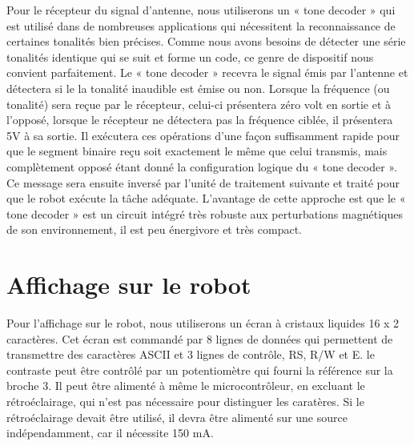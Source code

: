 Pour le récepteur du signal d’antenne, nous utiliserons un « tone decoder » qui est utilisé dans de nombreuses applications qui nécessitent la reconnaissance de certaines tonalités bien précises. Comme nous avons besoins de détecter une série tonalités identique qui se suit et forme un code, ce genre de dispositif nous convient parfaitement. Le « tone decoder » recevra le signal émis par l’antenne et détectera si le la tonalité inaudible est émise ou non. Lorsque la fréquence (ou tonalité) sera reçue par le récepteur, celui-ci présentera zéro volt en sortie et à l’opposé, lorsque le récepteur ne détectera pas la fréquence ciblée, il présentera 5V à sa sortie. Il exécutera ces opérations d’une façon suffisamment rapide pour que le segment binaire reçu soit exactement le même que celui transmis, mais complètement opposé étant donné la configuration logique du « tone decoder ».  Ce message sera ensuite inversé par l’unité de traitement suivante et traité pour que le robot exécute la tâche adéquate. L’avantage de cette approche est que le « tone decoder » est un circuit intégré très robuste aux perturbations magnétiques de son environnement, il est peu énergivore et très compact.

\section{Affichage sur le robot}

Pour l'affichage sur le robot, nous utiliserons un écran à cristaux liquides 16 x 2  caractères. Cet écran est commandé par 8 lignes de données qui permettent de transmettre des caractères ASCII et 3 lignes de contrôle, RS, R/W et E. le contraste peut être contrôlé par un potentiomètre qui fourni la référence sur la broche 3. Il peut être alimenté à même le microcontrôleur, en excluant le rétroéclairage, qui n'est pas nécessaire pour distinguer les caratères. Si le rétroéclairage devait être utilisé, il devra être alimenté sur une source indépendamment, car il nécessite 150 mA.

